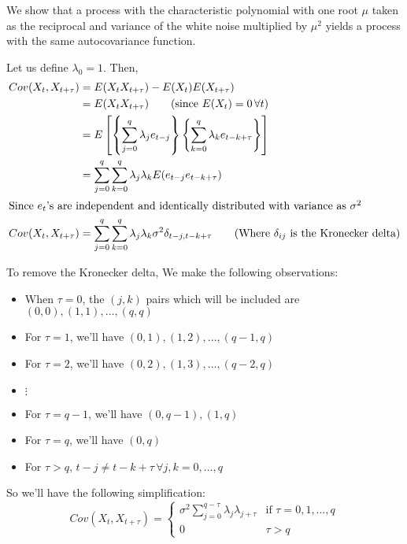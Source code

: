 \documentclass[12pt, oneside]{article}
\begin{document}
\begin{enumerate}
{    We show that a process with the characteristic polynomial with one root \(\mu\) taken
    as the reciprocal and variance of the white noise multiplied by \(\mu^2\) yields
    a process with the same autocovariance function.

    Let us define \(\lambda_0 = 1\). Then,
    \begin{align*}
        Cov(X_t, X_{t+\tau}) &= E(X_t X_{t+\tau}) - E(X_t)E(X_{t+\tau}) \\
            &= E(X_t X_{t+\tau}) \tag*{(since \(E(X_t) = 0 \,\forall t\))} \\
            &= E\left[\left\{\sum_{j=0}^{q}\lambda_j e_{t-j}\right\}\left\{\sum_{k=0}^{q}\lambda_k e_{t-k+\tau}\right\}\right] \\
            &= \sum_{j=0}^{q} \sum_{k=0}^{q} \lambda_j \lambda_k E(e_{t-j} e_{t-k+\tau}) \\
        \intertext{Since \(e_t\)'s are independent and identically distributed with variance as
        \(\sigma^2\)}
        Cov(X_t, X_{t+\tau}) &= \sum_{j=0}^{q} \sum_{k=0}^{q} \lambda_j \lambda_k \sigma^2 \delta_{t-j,t-k+\tau}
            \tag*{(Where \(\delta_{ij}\) is the Kronecker delta)}
    \end{align*}

    To remove the Kronecker delta, We make the following observations:
    \begin{itemize}
        \item When \(\tau = 0\), the \((j, k)\) pairs which will be included are \((0, 0), (1, 1), \ldots, (q, q)\)
        \item For \(\tau = 1\), we'll have \((0, 1), (1, 2), \ldots, (q-1, q)\)
        \item For \(\tau = 2\), we'll have \((0, 2), (1, 3), \ldots, (q-2, q)\)
        \item \(\vdots\)
        \item For \(\tau = q-1\), we'll have \((0, q-1), (1, q)\)
        \item For \(\tau = q\), we'll have \((0, q)\)
        \item For \(\tau > q\), \(t - j \neq t - k + \tau \,\forall j, k = 0, \ldots, q\)
    \end{itemize}

    So we'll have the following simplification:
    \begin{equation}
        Cov(X_t, X_{t+\tau}) = \begin{cases}
            \sigma^2 \sum_{j=0}^{q-\tau} \lambda_j \lambda_{j+\tau} & \text{if } \tau = 0, 1, \ldots, q \\
            0 & \tau > q
        \end{cases}
    \end{equation}

}
\end{enumerate}
\end{document}
